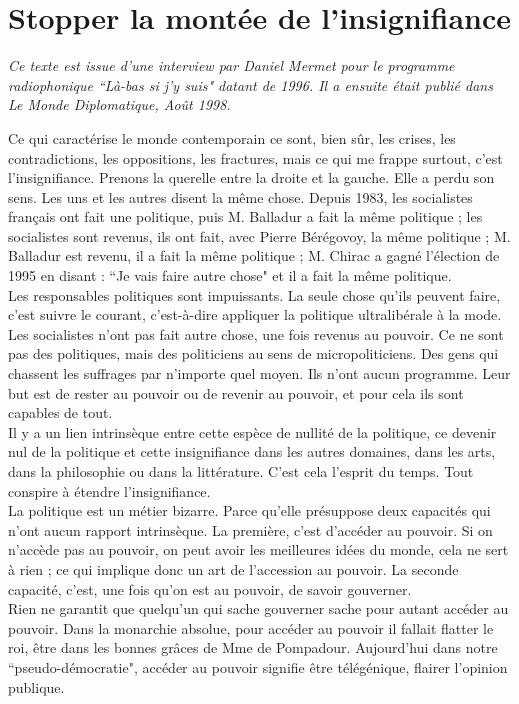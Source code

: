 \chapter{Stopper la montée de l'insignifiance}

\emph{Ce texte est issue d'une interview par Daniel Mermet pour le programme radiophonique ``L\`a-bas si j'y suis" datant de 1996. Il a ensuite était publié dans \emph{Le Monde Diplomatique}, Août 1998.\\}

Ce qui caractérise le monde contemporain ce sont, bien sûr, les crises, les contradictions, les oppositions, les fractures, mais ce qui me frappe surtout, c’est l’insignifiance. Prenons la querelle entre la droite et la gauche. Elle a perdu son sens. Les uns et les autres disent la même chose. Depuis 1983, les socialistes français ont fait une politique, puis M. Balladur a fait la même politique ; les socialistes sont revenus, ils ont fait, avec Pierre Bérégovoy, la même politique ; M. Balladur est revenu, il a fait la même politique ; M. Chirac a gagné l’élection de 1995 en disant : ``Je vais faire autre chose" et il a fait la même politique.\\
Les responsables politiques sont impuissants. La seule chose qu’ils peuvent faire, c’est suivre le courant, c’est-à-dire appliquer la politique ultralibérale à la mode. Les socialistes n’ont pas fait autre chose, une fois revenus au pouvoir. Ce ne sont pas des politiques, mais des politiciens au sens de micropoliticiens. Des gens qui chassent les suffrages par n’importe quel moyen. Ils n’ont aucun programme. Leur but est de rester au pouvoir ou de revenir au pouvoir, et pour cela ils sont capables de tout.\\
Il y a un lien intrinsèque entre cette espèce de nullité de la politique, ce devenir nul de la politique et cette insignifiance dans les autres domaines, dans les arts, dans la philosophie ou dans la littérature. C’est cela l’esprit du temps. Tout conspire à étendre l’insignifiance.\\
La politique est un métier bizarre. Parce qu’elle présuppose deux capacités qui n’ont aucun rapport intrinsèque. La première, c’est d’accéder au pouvoir. Si on n’accède pas au pouvoir, on peut avoir les meilleures idées du monde, cela ne sert à rien ; ce qui implique donc un art de l’accession au pouvoir. La seconde capacité, c’est, une fois qu’on est au pouvoir, de savoir gouverner.\\
Rien ne garantit que quelqu’un qui sache gouverner sache pour autant accéder au pouvoir. Dans la monarchie absolue, pour accéder au pouvoir il fallait flatter le roi, être dans les bonnes grâces de Mme de Pompadour. Aujourd’hui dans notre ``pseudo-démocratie", accéder au pouvoir signifie être télégénique, flairer l’opinion publique.\\
